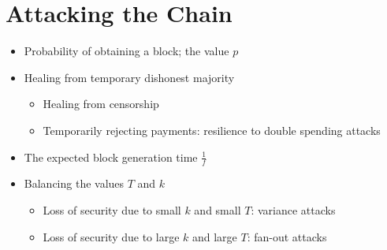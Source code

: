 \chapter{Attacking the Chain}

{\color{red}
\begin{itemize}
\item Probability of obtaining a block; the value $p$
\item Healing from temporary dishonest majority
    \begin{itemize}
    \item Healing from censorship
    \item Temporarily rejecting payments: resilience to double spending attacks
    \end{itemize}
\item The expected block generation time $\frac{1}{f}$
\item Balancing the values $T$ and $k$
    \begin{itemize}
    \item Loss of security due to small $k$ and small $T$: variance attacks
    \item Loss of security due to large $k$ and large $T$: fan-out attacks
    \end{itemize}
\end{itemize}
}
